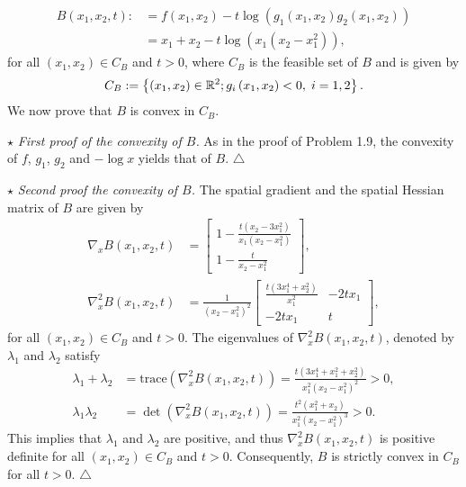 \documentclass[a4paper]{article}
\numberwithin{equation}{section}
\begin{document}
\begin{enumerate}
\begin{align}
B\left( {{x_1},{x_2},t} \right): &= f\left( {{x_1},{x_2}} \right) - t\log \left( {{g_1}\left( {{x_1},{x_2}} \right){g_2}\left( {{x_1},{x_2}} \right)} \right)\\
& = {x_1} + {x_2} - t\log \left( {{x_1}\left( {{x_2} - x_1^2} \right)} \right) ,
\end{align}
for all $\left(x_1,x_2\right)\in C_B$ and $t>0$, where $C_B$ is the feasible set of $B$ and is given by
\begin{align}
{C_B}: = \left\{ {\left( {{x_1},{x_2}} \right) \in {\mathbb{R}^2};{g_i}\left( {{x_1},{x_2}} \right) < 0,\hspace{0.1cm} i = 1,2} \right\}.
\end{align}
We now prove that $B$ is convex in $C_B$.

$\star$ \textit{First proof of the convexity of $B$.} As in the proof of Problem 1.9, the convexity of $f$, $g_1$, $g_2$ and $-\log x$ yields that of $B$. \hfill $\triangle$

$\star$ \textit{Second proof the convexity of $B$.} The spatial gradient and the spatial Hessian matrix of $B$ are given by
\begin{align}
\nabla _x B\left( {{x_1},{x_2},t} \right) &= \left[ {\begin{array}{*{20}{c}}
{1 - \frac{{t\left( {{x_2} - 3x_1^2} \right)}}{{{x_1}\left( {{x_2} - x_1^2} \right)}}}\\
{1 - \frac{t}{{{x_2} - x_1^2}}}
\end{array}} \right],\\
{\nabla _x^2}B\left( {{x_1},{x_2},t} \right) &= \frac{1}{{{{\left( {{x_2} - x_1^2} \right)}^2}}}\left[ {\begin{array}{*{20}{c}}
{\frac{{t\left( {3x_1^4 + x_2^2} \right)}}{{x_1^2}}}&{ - 2t{x_1}}\\
{ - 2t{x_1}}&t
\end{array}} \right],
\end{align}
for all $\left(x_1,x_2\right)\in C_B$ and $t>0$. The eigenvalues of ${\nabla _x^2}B\left( {{x_1},{x_2},t} \right)$, denoted by $\lambda _1$ and $\lambda _2$ satisfy
\begin{align}
{\lambda _1} + {\lambda _2} &= \mbox{trace}\left( {{\nabla _x^2}B\left( {{x_1},{x_2},t} \right)} \right) = \frac{{t\left( {3x_1^4 + x_1^2 + x_2^2} \right)}}{{x_1^2{{\left( {{x_2} - x_1^2} \right)}^2}}} > 0,\\
{\lambda _1}{\lambda _2} &= \det \left( {{\nabla _x^2}B\left( {{x_1},{x_2},t} \right)} \right) = \frac{{{t^2}\left( {x_1^2 + {x_2}} \right)}}{{x_1^2{{\left( {{x_2} - x_1^2} \right)}^3}}} > 0.
\end{align}
This implies that $\lambda _1$ and $\lambda _2$ are positive, and thus ${\nabla _x^2}B\left( {{x_1},{x_2},t} \right)$ is positive definite for all $\left(x_1,x_2\right)\in C_B$ and $t>0$. Consequently, $B$ is strictly convex in $C_B$ for all $t>0$. \hfill $\triangle$


\end{enumerate}
\end{document}
